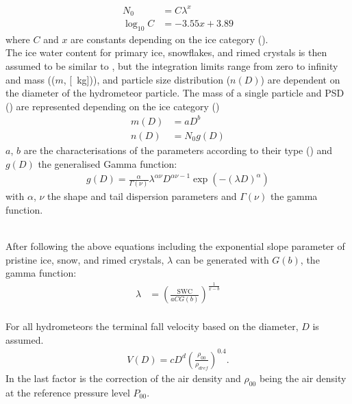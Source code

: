 \begin{align}
	N_0 & = C \lambda^x  \label{eq:model_N0}
	\\
	\log_{10}C & = -3.55x + 3.89  \nonumber
\end{align}
where $C$ and $x$ are constants depending on the ice category %
(). 
\\
The ice water content for primary ice, snowflakes, and rimed crystals is then assumed to be similar to , but the integration limits range from zero to infinity and mass (($m$, [\SI{}{\kg}])), and particle size distribution ($n(D)$) are dependent on the diameter of the hydrometeor particle. The mass of a single particle and PSD () are represented depending on the ice category ()
\begin{align}
	m(D) & = aD^b 	\label{eq:mass_diameter} \\
	n(D) & = N_0 g(D)	\label{eq:PSD_MEPS}
\end{align}
$a$, $b$ are the characterisations of the parameters according to their type () and $g(D)$ the generalised Gamma function: 
\begin{align}
	g(D) = \frac{\alpha}{\Gamma(\nu)} \lambda^{\alpha \nu} D^{\alpha \nu -1} \exp\left( -(\lambda D)^\alpha \right)
\end{align}
with $\alpha$, $\nu$ the shape and tail dispersion parameters and $\Gamma(\nu)$ the gamma function. 

\\
After following the above equations including  the exponential slope parameter of pristine ice, snow, and rimed crystals, $\lambda$ can be generated with $G(b)$, the gamma function:
\begin{align}
	\lambda & = \left( \frac{\text{SWC}}{aCG(b)}\right)^{\frac{1}{x-b}}
\end{align}
\\
For all hydrometeors the terminal fall velocity based on the diameter, $D$ is assumed.
\begin{align}
	V(D) = c D^d \left(\frac{\rho_{00}}{\rho_{dref}}\right)^0.4 . \label{eq:fall_velo_MEPS}
\end{align}
In  the last factor is the \citet{foote_terminal_1969} correction of the air density and $\rho_{00}$ being the air density at the reference pressure level $P_{00}$.
